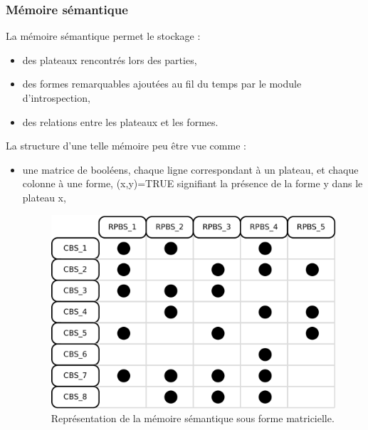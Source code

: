 \subsubsection{Mémoire sémantique}

La mémoire sémantique permet le stockage :
\begin{itemize}
\item des plateaux rencontrés lors des parties,
\item des formes remarquables ajoutées au fil du temps par le module  d'introspection,
\item des relations entre les plateaux et les formes.
\end{itemize}

La structure d'une telle mémoire peu être vue comme :
\begin{itemize}
\item une matrice de booléens, chaque ligne correspondant à un plateau, et chaque colonne à une forme, (x,y)=TRUE signifiant la présence de la forme y dans le plateau x,
\begin{figure}[h]
\includegraphics[width=\textwidth]{files/memoire/context_matrix}
\caption{Représentation de la mémoire sémantique sous forme matricielle.}
\end{figure}



\end{itemize}
